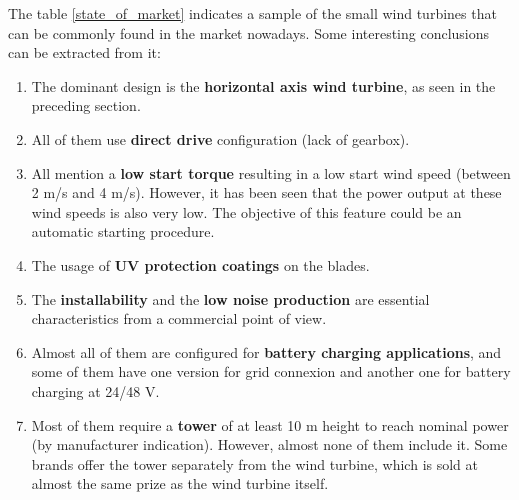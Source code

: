 \documentclass[../TFG_Report.tex]{subfiles}
\begin{document}
The table \ref{state_of_market} indicates a sample of the small wind turbines that can be commonly found in the market nowadays. Some interesting conclusions can be extracted from it:

\begin{enumerate}
	\item The dominant design is the \textbf{horizontal axis wind turbine}, as seen in the preceding section. 
	\item All of them use \textbf{direct drive} configuration (lack of gearbox).
	\item All mention a \textbf{low start torque} resulting in a low start wind speed (between 2 m/s and 4 m/s). However, it has been seen that the power output at these wind speeds is also very low. The objective of this feature could be an automatic starting procedure.
	\item The usage of \textbf{UV protection coatings} on the blades.
	\item The \textbf{installability} and the \textbf{low noise production} are essential characteristics from a commercial point of view. 
	\item Almost all of them are configured for \textbf{battery charging applications}, and some of them have one version for grid connexion and another one for battery charging at 24/48 V. 
	\item Most of them require a \textbf{tower} of at least 10 m height to reach nominal power (by manufacturer indication). However, almost none of them include it. Some brands offer the tower separately from the wind turbine, which is sold at almost the same prize as the wind turbine itself.
	
\end{enumerate}
\end{document}
